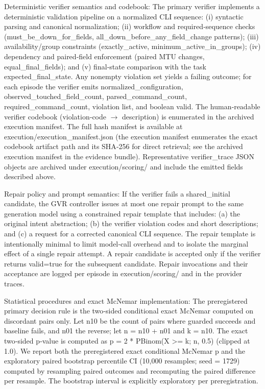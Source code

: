 \documentclass[conference]{IEEEtran}
\begin{document}
Deterministic verifier semantics and codebook: The primary verifier implements a deterministic validation pipeline on a normalized CLI sequence: (i) syntactic parsing and canonical normalization; (ii) workflow and required‑sequence checks (must\_be\_down\_for\_fields, all\_down\_before\_any\_field\_change patterns); (iii) availability/group constraints (exactly\_active, minimum\_active\_in\_groups); (iv) dependency and paired‑field enforcement (paired MTU changes, equal\_final\_fields); and (v) final‑state comparison with the task expected\_final\_state. Any nonempty violation set yields a failing outcome; for each episode the verifier emits normalized\_configuration, observed\_touched\_field\_count, parsed\_command\_count, required\_command\_count, violation list, and boolean valid. The human‑readable verifier codebook (violation‑code \ensuremath{\rightarrow} description) is enumerated in the archived execution manifest. The full hash manifest is available at execution/execution\_manifest.json (the execution manifest enumerates the exact codebook artifact path and its SHA‑256 for direct retrieval; see the archived execution manifest in the evidence bundle). Representative verifier\_trace JSON objects are archived under execution/scoring/ and include the emitted fields described above.

Repair policy and prompt semantics: If the verifier fails a shared\_initial candidate, the GVR controller issues at most one repair prompt to the same generation model using a constrained repair template that includes: (a) the original intent abstraction; (b) the verifier violation codes and short descriptions; and (c) a request for a corrected canonical CLI sequence. The repair template is intentionally minimal to limit model‑call overhead and to isolate the marginal effect of a single repair attempt. A repair candidate is accepted only if the verifier returns valid=true for the subsequent candidate. Repair invocations and their acceptance are logged per episode in execution/scoring/ and in the provider traces.

Statistical procedures and exact McNemar implementation: The preregistered primary decision rule is the two‑sided conditional exact McNemar computed on discordant pairs only. Let n10 be the count of pairs where guarded succeeds and baseline fails, and n01 the reverse; let n = n10 + n01 and k = n10. The exact two‑sided p‑value is computed as p = 2 * PBinom(X >= k; n, 0.5) (clipped at 1.0). We report both the preregistered exact conditional McNemar p and the exploratory paired bootstrap percentile CI (10,000 resamples; seed = 1729) computed by resampling paired outcomes and recomputing the paired difference per resample. The bootstrap interval is explicitly exploratory per preregistration.
\end{document}
